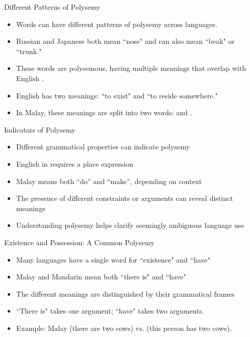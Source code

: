 \documentclass{beamer}
\newcommand{\ind}{\mtciteform}
\begin{document}
\begin{frame}{Different Patterns of Polysemy}
    \begin{itemize}
        \item Words can have different patterns of polysemy across languages.
        \item Russian  and Japanese  both mean ``nose" and can also mean ``beak" or ``trunk."
        \item These words are polysemous, having multiple meanings that overlap with English .
        \item English  has two meanings: ``to exist" and ``to reside somewhere."
        \item In Malay, these meanings are split into two words: \ind{hidup} and \ind{tinggal}.
    \end{itemize}
\end{frame}

\begin{frame}{Indicators of Polysemy}
    \begin{itemize}
        \item Different grammatical properties can indicate polysemy
        \item English  in requires a place expression
        \item Malay  means both ``do'' and ``make'', depending on context
        \item The presence of different constraints or arguments can reveal distinct meanings
        \item Understanding polysemy helps clarify seemingly ambiguous language use
    \end{itemize}
\end{frame}

\begin{frame}{Existence and Possession: A Common Polysemy}
    \begin{itemize}
        \item Many languages have a single word for ``existence" and ``have"
        \item Malay  and Mandarin  mean both ``there is" and ``have"
        \item The different meanings are distinguished by their grammatical frames
        \item ``There is" takes one argument; ``have" takes two arguments.
        \item Example: Malay  (there are two cows) vs.  (this person has two cows).
    \end{itemize}
\end{frame}
\end{document}
